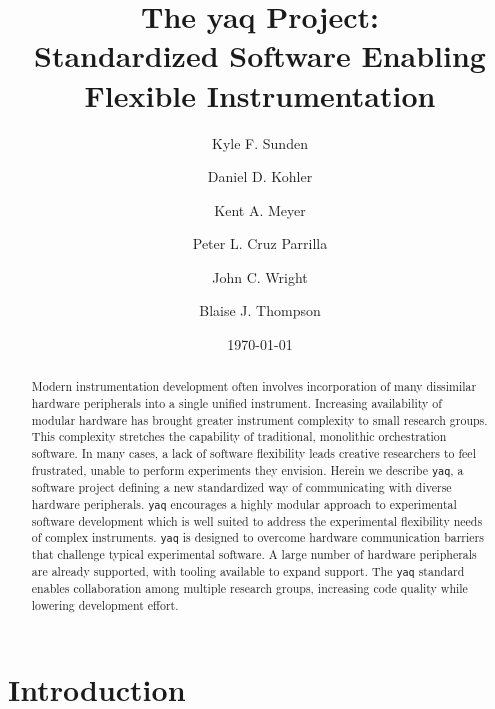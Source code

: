 \documentclass[aip, amsmath, amssymb, reprint,]{revtex4-2}
\newcommand\yaq{\texttt{yaq}}
\begin{document}

\title{The yaq Project: \\ Standardized Software Enabling Flexible Instrumentation}
\author{Kyle F. Sunden}
\author{Daniel D. Kohler}
\author{Kent A. Meyer}
\author{Peter L. Cruz Parrilla}
\author{John C. Wright}
\author{Blaise J. Thompson}

\date{\today}

\begin{abstract}

Modern instrumentation development often involves incorporation of many dissimilar hardware peripherals into a single unified instrument.
Increasing availability of modular hardware has brought greater instrument complexity to small research groups.
This complexity stretches the capability of traditional, monolithic orchestration software.
In many cases, a lack of software flexibility leads creative researchers to feel frustrated, unable to perform experiments they envision.
Herein we describe \yaq{}, a software project defining a new standardized way of communicating with diverse hardware peripherals.
\yaq{} encourages a highly modular approach to experimental software development which is well suited to address the experimental flexibility needs of complex instruments.
\yaq{} is designed to overcome hardware communication barriers that challenge typical experimental software.
A large number of hardware peripherals are already supported, with tooling available to expand support.
The \yaq{} standard enables collaboration among multiple research groups, increasing code quality while lowering development effort.

\end{abstract}

\maketitle

\section{Introduction}
\end{document}
